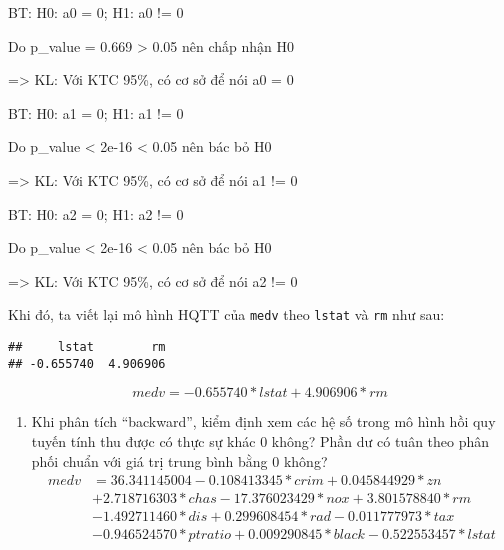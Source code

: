 \documentclass[
]{article}
\newenvironment{Shaded}{\begin{snugshade}}{\end{snugshade}}
\newcommand{\AttributeTok}[1]{\textcolor[rgb]{0.77,0.63,0.00}{#1}}
\newcommand{\DecValTok}[1]{\textcolor[rgb]{0.00,0.00,0.81}{#1}}
\newcommand{\FunctionTok}[1]{\textcolor[rgb]{0.00,0.00,0.00}{#1}}
\newcommand{\NormalTok}[1]{#1}
\newcommand{\OtherTok}[1]{\textcolor[rgb]{0.56,0.35,0.01}{#1}}
\newcommand{\SpecialCharTok}[1]{\textcolor[rgb]{0.00,0.00,0.00}{#1}}
\providecommand{\tightlist}{%
  \setlength{\itemsep}{0pt}\setlength{\parskip}{0pt}}
\begin{document}
BT: H0: a0 = 0; H1: a0 != 0

Do p\_value = 0.669 \textgreater{} 0.05 nên chấp nhận H0

=\textgreater{} KL: Với KTC 95\%, có cơ sở để nói a0 = 0

BT: H0: a1 = 0; H1: a1 != 0

Do p\_value \textless{} 2e-16 \textless{} 0.05 nên bác bỏ H0

=\textgreater{} KL: Với KTC 95\%, có cơ sở để nói a1 != 0

BT: H0: a2 = 0; H1: a2 != 0

Do p\_value \textless{} 2e-16 \textless{} 0.05 nên bác bỏ H0

=\textgreater{} KL: Với KTC 95\%, có cơ sở để nói a2 != 0

Khi đó, ta viết lại mô hình HQTT của \texttt{medv} theo \texttt{lstat}
và \texttt{rm} như sau:

\begin{Shaded}
\end{Shaded}

\begin{verbatim}
##     lstat        rm 
## -0.655740  4.906906
\end{verbatim}

\[
medv = -0.655740 * lstat +  4.906906*rm
\]

\begin{enumerate}
\def\labelenumi{\alph{enumi})}
\setcounter{enumi}{2}
\tightlist
\item
  Khi phân tích ``backward'', kiểm định xem các hệ số trong mô hình hồi
  quy tuyến tính thu được có thực sự khác 0 không? Phần dư có tuân theo
  phân phối chuẩn với giá trị trung bình bằng 0 không? \[
  \begin{aligned}
  medv &= 36.341145004  -0.108413345*crim  + 0.045844929*zn \\ 
  &+ 2.718716303*chas -17.376023429 * nox + 3.801578840 * rm  \\
  &-1.492711460*dis +  0.299608454*rad   -0.011777973 * tax \\
  &-0.946524570*ptratio + 0.009290845 * black  -0.522553457 *lstat
  \end{aligned}
  \]
\end{enumerate}
\end{document}
